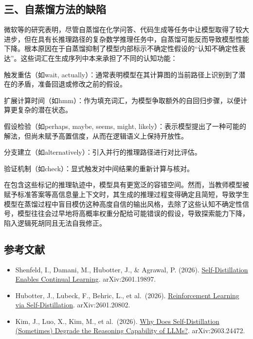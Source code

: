 \hypertarget{ux4e09ux81eaux84b8ux998fux65b9ux6cd5ux7684ux7f3aux9677}{%
\subsection{三、自蒸馏方法的缺陷}\label{ux4e09ux81eaux84b8ux998fux65b9ux6cd5ux7684ux7f3aux9677}}

微软等的研究表明，尽管自蒸馏在化学问答、代码生成等任务中让模型取得了较大进步，但在具有长推理路径的复杂数学推理任务中，自蒸馏可能反而导致模型性能下降。根本原因在于自蒸馏抑制了模型内部标示不确定性假设的``认知不确定性表达''。这些词汇在生成序列中本来承担了不同的认知功能：

触发重估（如wait, actually）：通常表明模型在其计算图的当前路径上识别到了潜在的矛盾，准备回退或修改之前的假设。

扩展计算时间（如hmm）：作为填充词汇，为模型争取额外的自回归步骤，以便计算更复杂的潜在状态。

假设检验（如perhaps, maybe, seems, might, likely）：表示模型提出了一种可能的解法，但尚未赋予高置信度，从而在逻辑语义上保持开放性。

分支建立（如alternatively）：引入并行的推理路径进行对比评估。

验证机制（如check）：显式触发对中间结果的重新计算与核对。

在包含这些标记的推理轨迹中，模型具有更宽泛的容错空间。然而，当教师模型被赋予标准答案等高信息量上下文时，其生成的推理过程变得确定且简短，导致学生模型在蒸馏过程中盲目模仿这种高度自信的输出风格，去除了这些认知不确定性信号，模型往往会过早地将高概率权重分配给可能错误的假设，导致探索能力下降，陷入逻辑死胡同且无法自我修正。

\hypertarget{ux53c2ux8003ux6587ux732e-147}{%
\subsection{参考文献}\label{ux53c2ux8003ux6587ux732e-147}}

\begin{itemize}
\tightlist
\item
  Shenfeld, I., Damani, M., Hubotter, J., \& Agrawal, P. (2026). \href{https://arxiv.org/abs/2601.19897}{Self-Distillation Enables Continual Learning}. arXiv:2601.19897.
\item
  Hubotter, J., Lubeck, F., Behric, L., et al.~(2026). \href{https://arxiv.org/abs/2601.20802}{Reinforcement Learning via Self-Distillation}. arXiv:2601.20802.
\item
  Kim, J., Luo, X., Kim, M., et al.~(2026). \href{https://arxiv.org/abs/2603.24472}{Why Does Self-Distillation (Sometimes) Degrade the Reasoning Capability of LLMs?}. arXiv:2603.24472.
\end{itemize}

